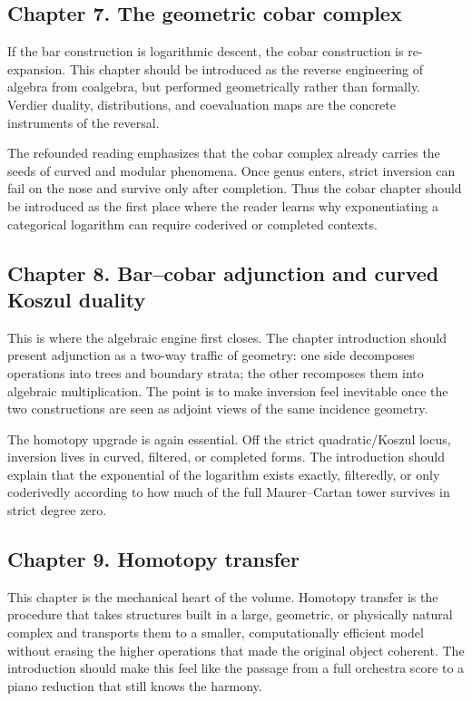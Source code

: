 \subsection*{Chapter 7. The geometric cobar complex}
If the bar construction is logarithmic descent, the cobar construction is re-expansion.  This chapter should be introduced as the reverse engineering of algebra from coalgebra, but performed geometrically rather than formally.  Verdier duality, distributions, and coevaluation maps are the concrete instruments of the reversal.

The refounded reading emphasizes that the cobar complex already carries the seeds of curved and modular phenomena.  Once genus enters, strict inversion can fail on the nose and survive only after completion.  Thus the cobar chapter should be introduced as the first place where the reader learns why exponentiating a categorical logarithm can require coderived or completed contexts.

\subsection*{Chapter 8. Bar--cobar adjunction and curved Koszul duality}
This is where the algebraic engine first closes.  The chapter introduction should present adjunction as a two-way traffic of geometry: one side decomposes operations into trees and boundary strata; the other recomposes them into algebraic multiplication.  The point is to make inversion feel inevitable once the two constructions are seen as adjoint views of the same incidence geometry.

The homotopy upgrade is again essential.  Off the strict quadratic/Koszul locus, inversion lives in curved, filtered, or completed forms.  The introduction should explain that the exponential of the logarithm exists exactly, filteredly, or only coderivedly according to how much of the full Maurer--Cartan tower survives in strict degree zero.

\subsection*{Chapter 9. Homotopy transfer}
This chapter is the mechanical heart of the volume.  Homotopy transfer is the procedure that takes structures built in a large, geometric, or physically natural complex and transports them to a smaller, computationally efficient model without erasing the higher operations that made the original object coherent.  The introduction should make this feel like the passage from a full orchestra score to a piano reduction that still knows the harmony.

